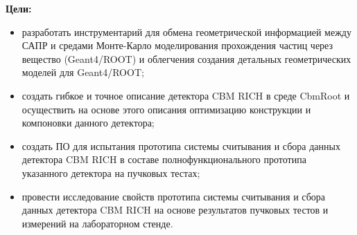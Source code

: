 \textbf{Цели:}

\begin{itemize}
\item{разработать инструментарий для обмена геометрической информацией между САПР и средами Монте-Карло моделирования прохождения частиц через вещество (Geant4/ROOT) и облегчения создания детальных геометрических моделей для Geant4/ROOT;}
\item{создать гибкое и точное описание детектора CBM RICH в среде CbmRoot и осуществить на основе этого описания оптимизацию конструкции и компоновки данного детектора;}
\item{создать ПО для испытания прототипа системы считывания и сбора данных детектора CBM RICH в составе полнофункционального прототипа указанного детектора на пучковых тестах;}
\item{провести исследование свойств прототипа системы считывания и сбора данных детектора CBM RICH на основе результатов пучковых тестов и измерений на лабораторном стенде.}
\end{itemize}